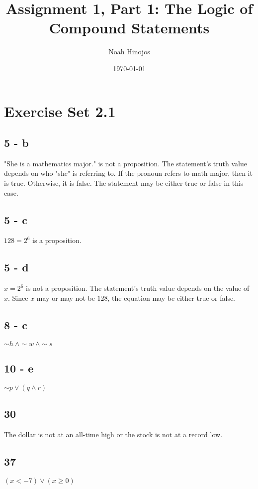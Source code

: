 \documentclass[12pt]{article}
\title{\textbf{Assignment 1, Part 1: The Logic of Compound Statements}}
\author{Noah Hinojos}
\date{\today}
\begin{document}
\maketitle

\section*{Exercise Set 2.1}

\subsection*{5 - b}
"She is a mathematics major." is not a proposition. The statement's truth value depends on who "she" is referring to. If the pronoun refers to math major, then it is true. Otherwise, it is false. The statement may be either true or false in this case.

\subsection*{5 - c}
$128 = 2^6$ is a proposition.

\subsection*{5 - d}
$x = 2^6$ is not a proposition. The statement's truth value depends on the value of $x$. Since $x$ may or may not be $128$, the equation may be either true or false.

\subsection*{8 - c}
$ \sim h \ \wedge \sim w \ \wedge \sim s$

\subsection*{10 - e}
$ \sim p \vee (q \wedge r)$

\subsection*{30}
The dollar is not at an all-time high or the stock is not at a record low.

\subsection*{37}
$(x < -7)\vee(x \geq 0)$
\end{document}
